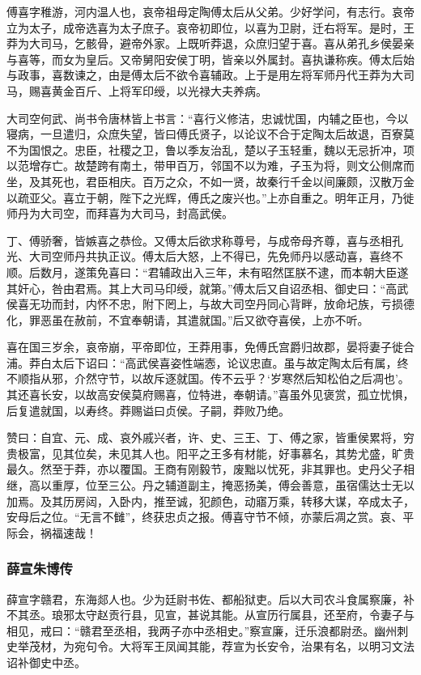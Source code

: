 \documentclass[]{article}
\begin{document}
傅喜字稚游，河内温人也，哀帝祖母定陶傅太后从父弟。少好学问，有志行。哀帝立为太子，成帝选喜为太子庶子。哀帝初即位，以喜为卫尉，迁右将军。是时，王莽为大司马，乞骸骨，避帝外家。上既听莽退，众庶归望于喜。喜从弟孔乡侯晏亲与喜等，而女为皇后。又帝舅阳安侯丁明，皆亲以外属封。喜执谦称疾。傅太后始与政事，喜数谏之，由是傅太后不欲令喜辅政。上于是用左将军师丹代王莽为大司马，赐喜黄金百斤、上将军印绶，以光禄大夫养病。

大司空何武、尚书令唐林皆上书言：``喜行义修洁，忠诚忧国，内辅之臣也，今以寝病，一旦遣归，众庶失望，皆曰傅氏贤子，以论议不合于定陶太后故退，百寮莫不为国恨之。忠臣，社稷之卫，鲁以季友治乱，楚以子玉轻重，魏以无忌折冲，项以范增存亡。故楚跨有南土，带甲百万，邻国不以为难，子玉为将，则文公侧席而坐，及其死也，君臣相庆。百万之众，不如一贤，故秦行千金以间廉颇，汉散万金以疏亚父。喜立于朝，陛下之光辉，傅氏之废兴也。''上亦自重之。明年正月，乃徙师丹为大司空，而拜喜为大司马，封高武侯。

丁、傅骄奢，皆嫉喜之恭俭。又傅太后欲求称尊号，与成帝母齐尊，喜与丞相孔光、大司空师丹共执正议。傅太后大怒，上不得已，先免师丹以感动喜，喜终不顺。后数月，遂策免喜曰：``君辅政出入三年，未有昭然匡朕不逮，而本朝大臣遂其奸心，咎由君焉。其上大司马印绶，就第。''傅太后又自诏丞相、御史曰：``高武侯喜无功而封，内怀不忠，附下罔上，与故大司空丹同心背畔，放命圮族，亏损德化，罪恶虽在赦前，不宜奉朝请，其遣就国。''后又欲夺喜侯，上亦不听。

喜在国三岁余，哀帝崩，平帝即位，王莽用事，免傅氏宫爵归故郡，晏将妻子徙合浦。莽白太后下诏曰：``高武侯喜姿性端悫，论议忠直。虽与故定陶太后有属，终不顺指从邪，介然守节，以故斥逐就国。传不云乎？`岁寒然后知松伯之后凋也'。其还喜长安，以故高安侯莫府赐喜，位特进，奉朝请。''喜虽外见褒赏，孤立忧惧，后复遣就国，以寿终。莽赐谥曰贞侯。子嗣，莽败乃绝。

赞曰：自宜、元、成、哀外戚兴者，许、史、三王、丁、傅之家，皆重侯累将，穷贵极富，见其位矣，未见其人也。阳平之王多有材能，好事慕名，其势尤盛，旷贵最久。然至于莽，亦以覆国。王商有刚毅节，废黜以忧死，非其罪也。史丹父子相继，高以重厚，位至三公。丹之辅道副主，掩恶扬美，傅会善意，虽宿儒达士无以加焉。及其历房闼，入卧内，推至诚，犯颜色，动寤万乘，转移大谋，卒成太子，安母后之位。``无言不雠''，终获忠贞之报。傅喜守节不倾，亦蒙后凋之赏。哀、平际会，祸福速哉！

\hypertarget{header-n5678}{%
\subsubsection{薛宣朱博传}\label{header-n5678}}

薛宣字赣君，东海郯人也。少为廷尉书佐、都船狱吏。后以大司农斗食属察廉，补不其丞。琅邪太守赵贡行县，见宣，甚说其能。从宣历行属县，还至府，令妻子与相见，戒曰：``赣君至丞相，我两子亦中丞相史。''察宣廉，迁乐浪都尉丞。幽州刺史举茂材，为宛句令。大将军王凤闻其能，荐宣为长安令，治果有名，以明习文法诏补御史中丞。
\end{document}

